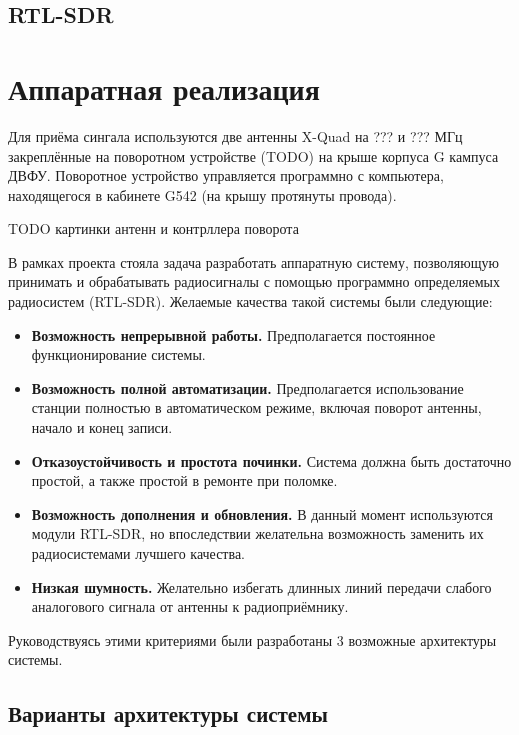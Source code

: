 \documentclass[a4paper, 14pt, titlepage, fleqn]{extarticle}
\begin{document}
	\subsection*{RTL-SDR}
	
	
	
	\pagebreak
	\section*{Аппаратная реализация}
	
	Для приёма сингала используются две антенны X-Quad на ??? и ??? МГц закреплённые на поворотном устройстве (TODO) на крыше корпуса G кампуса ДВФУ. Поворотное устройство управляется программно с компьютера, находящегося в кабинете G542 (на крышу протянуты провода).
	
	TODO картинки антенн и контрллера поворота
	
	В рамках проекта стояла задача разработать аппаратную систему, позволяющую принимать и обрабатывать радиосигналы с помощью программно определяемых радиосистем (RTL-SDR). Желаемые качества такой системы были следующие:
	\begin{itemize}
		\item \textbf{Возможность непрерывной работы.} Предполагается постоянное функционирование системы.
		\item \textbf{Возможность полной автоматизации.} Предполагается использование станции полностью в автоматическом режиме, включая поворот антенны, начало и конец записи.
		\item \textbf{Отказоустойчивость и простота починки.} Система должна быть достаточно простой, а также простой в ремонте при поломке.
		\item \textbf{Возможность дополнения и обновления.} В данный момент используются модули RTL-SDR, но впоследствии желательна возможность заменить их радиосистемами лучшего качества.
		\item \textbf{Низкая шумность.} Желательно избегать длинных линий передачи слабого аналогового сигнала от антенны к радиоприёмнику.
	\end{itemize}
	
	Руководствуясь этими критериями были разработаны 3 возможные архитектуры системы.
	
	\subsection*{Варианты архитектуры системы}
	
\end{document}
